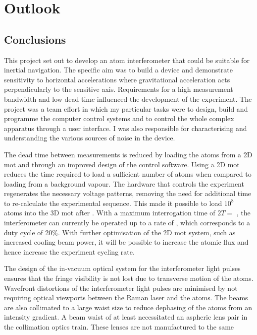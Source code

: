 \chapter{Outlook}
\section{Conclusions}
This project set out to develop an atom interferometer that could be
suitable for 
inertial navigation. The specific aim was to build a device and demonstrate sensitivity
to horizontal accelerations where gravitational acceleration acts
perpendicularly to the sensitive axis. Requirements for a high
measurement bandwidth and low dead time influenced the development of
the experiment. The project was a team effort in which my particular
tasks were to design, build and programme the computer control systems
and to control the whole complex apparatus through a user interface. I
was also responsible for characterising and understanding the various
sources of noise in the device. 
\par\noindent
The dead time between measurements is reduced by
loading the atoms from a 2D \ac{mot} and through an improved design of
the control software. Using a 2D \ac{mot} reduces the time required to
load a sufficient number of atoms when compared to loading from a
background vapour. The hardware that controls the experiment
regenerates the necessary voltage patterns, removing the need for
additional time to
re-calculate the experimental sequence. This made it possible to load
$10^8$ atoms into the 3D \ac{mot} after . With a
maximum interrogation time of $2T = $ , the
interferometer can currently be operated up to a rate of , which
corresponds to a duty cycle of 20\%. With further optimisation of the
2D \ac{mot} system, such as increased cooling beam power, it will be
possible to increase the atomic flux and hence increase the experiment
cycling rate. 
\par\noindent
The design of the in-vacuum optical system for the interferometer
light pulses ensures that the fringe visibility is not lost due to
transverse motion of the atoms. Wavefront distortions
of the interferometer light pulses are minimised by not requiring
optical viewports between the Raman laser and the atoms. The beams
are also collimated to a large waist size to reduce dephasing of the
atoms from an intensity gradient. A beam waist of at least
 necessitated an aspheric lens pair in the
collimation optics train. These lenses are not manufactured to the same
